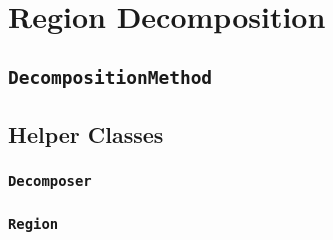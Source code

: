 \chapter{Region Decomposition}

\section{\texttt{DecompositionMethod}}

\section{Helper Classes}

\subsection{\texttt{Decomposer}}

\subsection{\texttt{Region}}
